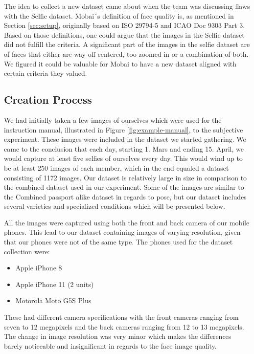 The idea to collect a new dataset came about when the team was discussing flaws with the Selfie dataset. Mobai´s definition of face quality is, as mentioned in Section \ref{sec:setup}, originally based on ISO 29794-5 and ICAO Doc 9303 Part 3. Based on those definitions, one could argue that the images in the Selfie dataset did not fulfill the criteria. A significant part of the images in the selfie dataset are of faces that either are way off-centered, too zoomed in or a combination of both. We figured it could be valuable for Mobai to have a new dataset aligned with certain criteria they valued. 

\subsection*{Creation Process}
We had initially taken a few images of ourselves which were used for the instruction manual, illustrated in Figure \ref{fig:example-manual}, to the subjective experiment. These images were included in the dataset we started gathering. We came to the conclusion that each day, starting 1. Mars and ending 15. April, we would capture at least five selfies of ourselves every day. This would wind up to be at least 250 images of each member, which in the end equaled a dataset consisting of 1172 images. Our dataset is relatively large in size in comparison to the combined dataset used in our experiment. Some of the images are similar to the Combined passport alike dataset in regards to pose, but our dataset includes several varieties and specialized conditions which will be presented below. 

All the images were captured using both the front and back camera of our mobile phones. This lead to our dataset containing images of varying resolution, given that our phones were not of the same type. The phones used for the dataset collection were:
\begin{itemize}
    \item Apple iPhone 8 
    \item Apple iPhone 11 (2 units)
    \item Motorola Moto G5S Plus 
\end{itemize}
These had different camera specifications with the front cameras ranging from seven to 12 megapixels and the back cameras ranging from 12 to 13 megapixels. The change in image resolution was very minor which makes the differences barely noticeable and insignificant in regards to the face image quality.

